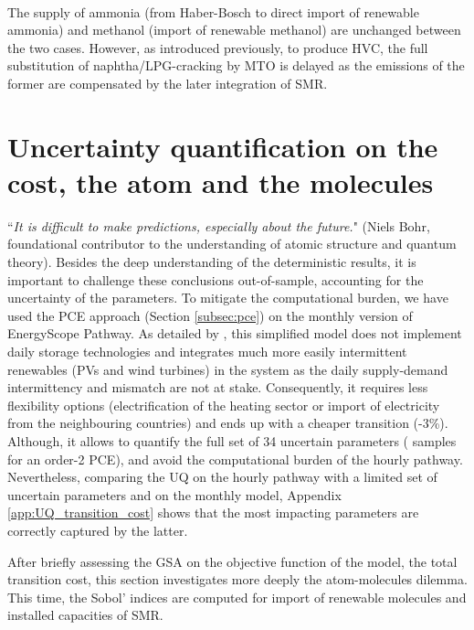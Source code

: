 \\

The supply of ammonia (\ie from Haber-Bosch to direct import of renewable ammonia) and methanol (\ie import of renewable methanol) are unchanged between the two cases. However, as introduced previously, to produce \gls{HVC}, the full substitution of naphtha/LPG-cracking by \gls{MTO} is delayed as the emissions of the former are compensated by the later integration of \gls{SMR}.

\section{Uncertainty quantification on the cost, the atom and the molecules}
\label{sec:atom_mol:results_uq}
``\textit{It is difficult to make predictions, especially about the future.}" (Niels Bohr, foundational contributor to the understanding of atomic structure and quantum theory). Besides the deep understanding of the deterministic results, it is important to challenge these conclusions out-of-sample, accounting for the uncertainty of the parameters. To mitigate the computational burden, we have used the \gls{PCE} approach (Section \ref{subsec:pce}) on the monthly version of EnergyScope Pathway. As detailed by \citet{limpens2024pathway}, this simplified model does not implement daily storage technologies and integrates much more easily intermittent renewables (PVs and wind turbines) in the system as the daily supply-demand intermittency and mismatch are not at stake. Consequently, it requires less flexibility options (\ie electrification of the heating sector or import of electricity from the neighbouring countries) and ends up with a cheaper transition (-3\%). Although, it allows to quantify the full set of 34 uncertain parameters ( samples for an order-2 \gls{PCE}), and avoid the computational burden of the hourly pathway. Nevertheless, comparing the \gls{UQ} on the hourly pathway with a limited set of uncertain parameters and on the monthly model, Appendix \ref{app:UQ_transition_cost} shows that the most impacting parameters are correctly captured by the latter.

After briefly assessing the \gls{GSA} on the objective function of the model, the total transition cost, this section investigates more deeply the atom-molecules dilemma. This time, the Sobol' indices are computed for import of renewable molecules and installed capacities of \gls{SMR}.

